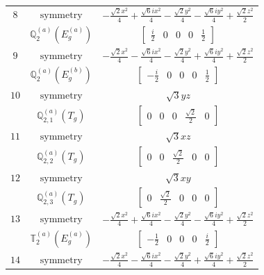\documentclass[fleqn,8pt,landscape]{jsarticle}
\begin{document}
\begin{longtable}{ccc}
$ 8 $ & $ \text{symmetry} $ & $ - \frac{\sqrt{2} x^{2}}{4} + \frac{\sqrt{6} i x^{2}}{4} - \frac{\sqrt{2} y^{2}}{4} - \frac{\sqrt{6} i y^{2}}{4} + \frac{\sqrt{2} z^{2}}{2} $ \\
$  $ & $ \mathbb{Q}_{2}^{(a)}(E_{g}^{(a)}) $ & $ \begin{bmatrix} \frac{i}{2} & 0 & 0 & 0 & \frac{1}{2} \end{bmatrix} $ \\ \hline
$ 9 $ & $ \text{symmetry} $ & $ - \frac{\sqrt{2} x^{2}}{4} - \frac{\sqrt{6} i x^{2}}{4} - \frac{\sqrt{2} y^{2}}{4} + \frac{\sqrt{6} i y^{2}}{4} + \frac{\sqrt{2} z^{2}}{2} $ \\
$  $ & $ \mathbb{Q}_{2}^{(a)}(E_{g}^{(b)}) $ & $ \begin{bmatrix} - \frac{i}{2} & 0 & 0 & 0 & \frac{1}{2} \end{bmatrix} $ \\ \hline
$ 10 $ & $ \text{symmetry} $ & $ \sqrt{3} y z $ \\
$  $ & $ \mathbb{Q}_{2,1}^{(a)}(T_{g}) $ & $ \begin{bmatrix} 0 & 0 & 0 & \frac{\sqrt{2}}{2} & 0 \end{bmatrix} $ \\ \hline
$ 11 $ & $ \text{symmetry} $ & $ \sqrt{3} x z $ \\
$  $ & $ \mathbb{Q}_{2,2}^{(a)}(T_{g}) $ & $ \begin{bmatrix} 0 & 0 & \frac{\sqrt{2}}{2} & 0 & 0 \end{bmatrix} $ \\ \hline
$ 12 $ & $ \text{symmetry} $ & $ \sqrt{3} x y $ \\
$  $ & $ \mathbb{Q}_{2,3}^{(a)}(T_{g}) $ & $ \begin{bmatrix} 0 & \frac{\sqrt{2}}{2} & 0 & 0 & 0 \end{bmatrix} $ \\ \hline
$ 13 $ & $ \text{symmetry} $ & $ - \frac{\sqrt{2} x^{2}}{4} + \frac{\sqrt{6} i x^{2}}{4} - \frac{\sqrt{2} y^{2}}{4} - \frac{\sqrt{6} i y^{2}}{4} + \frac{\sqrt{2} z^{2}}{2} $ \\
$  $ & $ \mathbb{T}_{2}^{(a)}(E_{g}^{(a)}) $ & $ \begin{bmatrix} - \frac{1}{2} & 0 & 0 & 0 & \frac{i}{2} \end{bmatrix} $ \\ \hline
$ 14 $ & $ \text{symmetry} $ & $ - \frac{\sqrt{2} x^{2}}{4} - \frac{\sqrt{6} i x^{2}}{4} - \frac{\sqrt{2} y^{2}}{4} + \frac{\sqrt{6} i y^{2}}{4} + \frac{\sqrt{2} z^{2}}{2} $ \\

\end{longtable}
\end{document}
